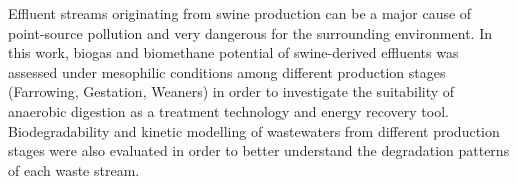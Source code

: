 Effluent streams originating from swine production can be a major cause of point-source pollution and very dangerous for the surrounding environment. In this work, biogas and biomethane potential of swine-derived effluents was assessed under mesophilic conditions among different production stages (Farrowing, Gestation, Weaners) in order to investigate the suitability of anaerobic digestion as a treatment technology and energy recovery tool. Biodegradability and kinetic modelling of wastewaters from different production stages were also evaluated in order to better understand the degradation patterns of each waste stream.